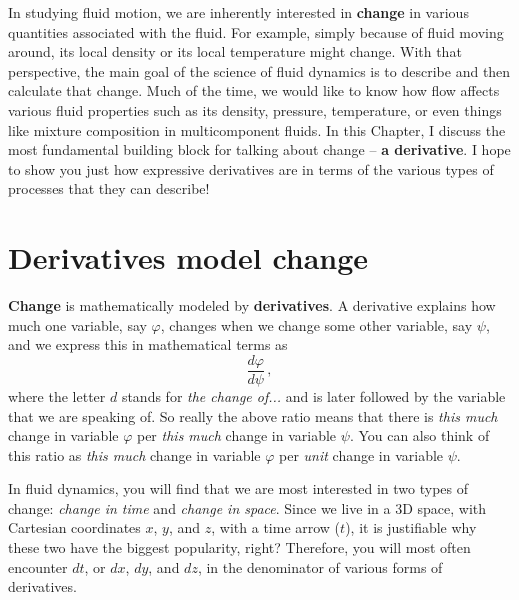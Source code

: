 

In studying fluid motion, we are inherently interested in \textbf{change} in various quantities associated with the fluid. For example, simply because of fluid moving around, its local density or its local temperature might change. With that perspective, the main goal of the science of fluid dynamics is to describe and then calculate that change. Much of the time, we would like to know how flow affects various fluid properties such as its density, pressure, temperature, or even things like mixture composition in multicomponent fluids.
In this Chapter, I discuss the most fundamental building block for talking about change -- \textbf{a derivative}. I hope to show you just how expressive derivatives are in terms of the various types of processes that they can describe!

\section{Derivatives model change}

\textbf{Change} is mathematically modeled by \textbf{derivatives}. A derivative explains how much one variable, say $\varphi$, changes when we change some other variable, say $\psi$, and we express this in mathematical terms as
\begin{equation*}\label{eq:change-d}
\frac{d \varphi}{d \psi} \, ,
\end{equation*}
where the letter $d$ stands for \textit{the change of...} and is later followed by the variable that we are speaking of. So really the above ratio means that there is \textit{this much} change in variable $\varphi$ per \textit{this much} change in variable $\psi$. You can also think of this ratio as \textit{this much} change in variable $\varphi$ per \textit{unit} change in variable $\psi$.

In fluid dynamics, you will find that we are most interested in two types of change: \textit{change in time} and \textit{change in space}. Since we live in a 3D space, with Cartesian coordinates $x$, $y$, and $z$, with a time arrow ($t$), it is justifiable why these two have the biggest popularity, right? Therefore, you will most often encounter $dt$, or $dx$, $dy$, and $dz$, in the denominator of various forms of derivatives.

